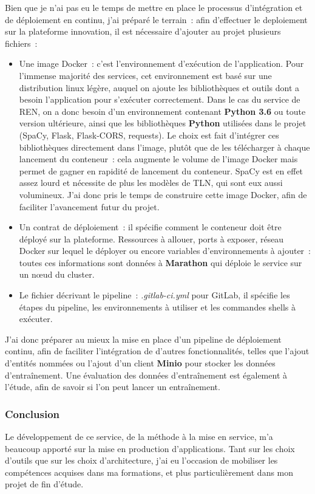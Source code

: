 Bien que je n'ai pas eu le temps de mettre en place le processus d'intégration et de déploiement en continu, j'ai préparé le terrain~: afin d'effectuer le deploiement sur la plateforme innovation, il est nécessaire d'ajouter au projet plusieurs fichiers~:
\vspace{5pt}
\begin{itemize}
    \item Une image Docker~: c'est l'environnement d'exécution de l'application. Pour l'immense majorité des services, cet environnement est basé sur une distribution linux légère, auquel on ajoute les bibliothèques et outils dont a besoin l'application pour s'exécuter correctement. Dans le cas du service de REN, on a donc besoin d'un environnement contenant \textbf{Python 3.6} ou toute version ultérieure, ainsi que les bibliothèques \textbf{Python} utilisées dans le projet (SpaCy, Flask, Flask-CORS, requests). Le choix est fait d'intégrer ces bibliothèques directement dans l'image, plutôt que de les télécharger à chaque lancement du conteneur~: cela augmente le volume de l'image Docker mais permet de gagner en rapidité de lancement du conteneur. SpaCy est en effet assez lourd et nécessite de plus les modèles de TLN, qui sont eux aussi volumineux. J'ai donc pris le temps de construire cette image Docker, afin de faciliter l'avancement futur du projet.
    \vspace{5pt}
    \item Un contrat de déploiement~: il spécifie comment le conteneur doit être déployé sur la plateforme. Ressources à allouer, ports à exposer, réseau Docker sur lequel le déployer ou encore variables d'environnements à ajouter~: toutes ces informations sont données à \textbf{Marathon} qui déploie le service sur un nœud du cluster. 
    \vspace{5pt}
    \item Le fichier décrivant le pipeline~: \textit{.gitlab-ci.yml} pour GitLab, il spécifie les étapes du pipeline, les environnements à utiliser et les commandes shells à exécuter.
    \newline
\end{itemize}

J'ai donc préparer au mieux la mise en place d'un pipeline de déploiement continu, afin de faciliter l'intégration de d'autres fonctionnalités, telles que l'ajout d'entités nommées ou l'ajout d'un client \textbf{Minio} pour stocker les données d'entraînement. Une évaluation des données d'entraînement est également à l'étude, afin de savoir si l'on peut lancer un entraînement.
\label{section 3.2.3}

\subsubsection*{Conclusion}
Le développement de ce service, de la méthode à la mise en service, m'a beaucoup apporté sur la mise en production d'applications. Tant sur les choix d'outils que sur les choix d'architecture, j'ai eu l'occasion de mobiliser les compétences acquises dans ma formations, et plus particulièrement dans mon projet de fin d'étude.
